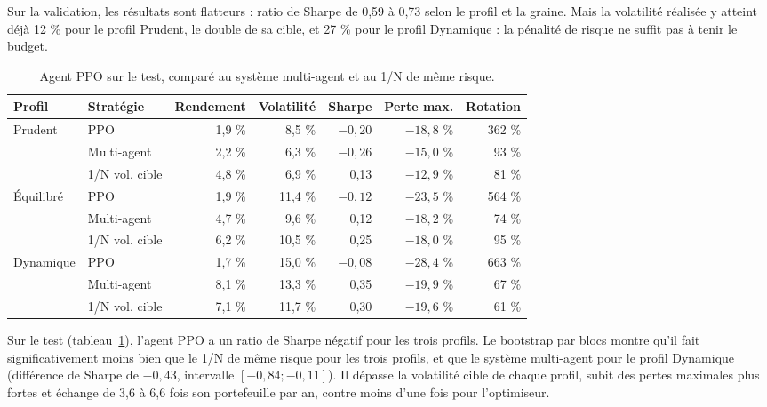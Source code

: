 Sur la validation, les résultats sont flatteurs : ratio de Sharpe de 0,59 à 0,73 selon le profil et la graine. Mais la volatilité réalisée y atteint déjà 12 \% pour le profil Prudent, le double de sa cible, et 27 \% pour le profil Dynamique : la pénalité de risque ne suffit pas à tenir le budget.

\begin{table}[!htb]
  \centering
  \small
  \caption{Agent PPO sur le test, comparé au système multi-agent et au 1/N de même risque.}
  \label{tab:ppo}
  \begin{tabular}{@{}l l r r r r r@{}}
    \toprule
    \textbf{Profil} & \textbf{Stratégie} & \textbf{Rendement} & \textbf{Volatilité} & \textbf{Sharpe} & \textbf{Perte max.} & \textbf{Rotation} \\
    \midrule
    \multirow{3}{*}{Prudent} & PPO & 1,9 \% & 8,5 \% & $-0{,}20$ & $-18{,}8$ \% & 362 \% \\
     & Multi-agent & 2,2 \% & 6,3 \% & $-0{,}26$ & $-15{,}0$ \% & 93 \% \\
     & 1/N vol. cible & 4,8 \% & 6,9 \% & 0,13 & $-12{,}9$ \% & 81 \% \\
    \midrule
    \multirow{3}{*}{Équilibré} & PPO & 1,9 \% & 11,4 \% & $-0{,}12$ & $-23{,}5$ \% & 564 \% \\
     & Multi-agent & 4,7 \% & 9,6 \% & 0,12 & $-18{,}2$ \% & 74 \% \\
     & 1/N vol. cible & 6,2 \% & 10,5 \% & 0,25 & $-18{,}0$ \% & 95 \% \\
    \midrule
    \multirow{3}{*}{Dynamique} & PPO & 1,7 \% & 15,0 \% & $-0{,}08$ & $-28{,}4$ \% & 663 \% \\
     & Multi-agent & 8,1 \% & 13,3 \% & 0,35 & $-19{,}9$ \% & 67 \% \\
     & 1/N vol. cible & 7,1 \% & 11,7 \% & 0,30 & $-19{,}6$ \% & 61 \% \\
    \bottomrule
  \end{tabular}
\end{table}

Sur le test (tableau~\ref{tab:ppo}), l'agent PPO a un ratio de Sharpe négatif pour les trois profils. Le bootstrap par blocs montre qu'il fait significativement moins bien que le 1/N de même risque pour les trois profils, et que le système multi-agent pour le profil Dynamique (différence de Sharpe de $-0{,}43$, intervalle $[-0{,}84 ; -0{,}11]$). Il dépasse la volatilité cible de chaque profil, subit des pertes maximales plus fortes et échange de 3,6 à 6,6 fois son portefeuille par an, contre moins d'une fois pour l'optimiseur.

